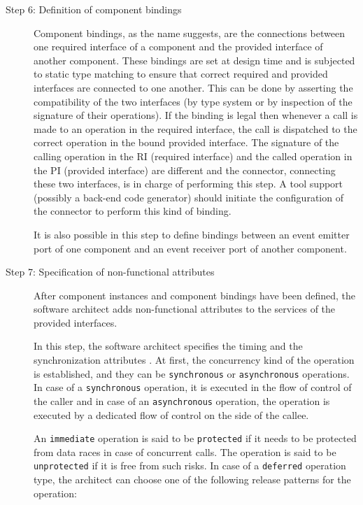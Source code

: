 \begin{description}
\item [Step 6: Definition of component bindings] Component bindings, as the name suggests, are the connections between one required interface of a component and the provided interface of another component. These bindings are set at design time and is subjected to static type matching to ensure that correct required and provided interfaces are connected to one another. This can be done by asserting the compatibility of the two interfaces (by type system or by inspection of the signature of their operations). If the binding is legal then whenever a call is made to an operation in the required interface, the call is dispatched to the correct operation in the bound provided interface. The signature of the calling operation in the RI (required interface) and the called operation in the PI (provided interface) are different and the connector, connecting these two interfaces, is in charge of performing this step. A tool support (possibly a back-end code generator) should initiate the configuration of the connector to perform this kind of binding.

It is also possible in this step to define bindings between an event emitter port of one component and an event receiver port of another component.

\item [Step 7: Specification of non-functional attributes] After component instances and component bindings have been defined, the software architect adds non-functional attributes to the services of the provided interfaces. 

In this step, the software architect specifies the timing and the synchronization attributes \cite{CompBasedProcess}. At first, the concurrency kind of the operation is established, and they can be \texttt{synchronous} or \texttt{asynchronous} operations. In case of a \texttt{synchronous} operation, it is executed in the flow of control of the caller and in case of an \texttt{asynchronous} operation, the operation is executed by a dedicated flow of control on the side of the callee. 

An \texttt{immediate} operation is said to be \texttt{protected} if it needs to be protected from data races in case of concurrent calls. The operation is said to be \texttt{unprotected} if it is free from such risks. In case of a \texttt{deferred} operation type, the architect can choose one of the following release patterns for the operation:


\end{description}
